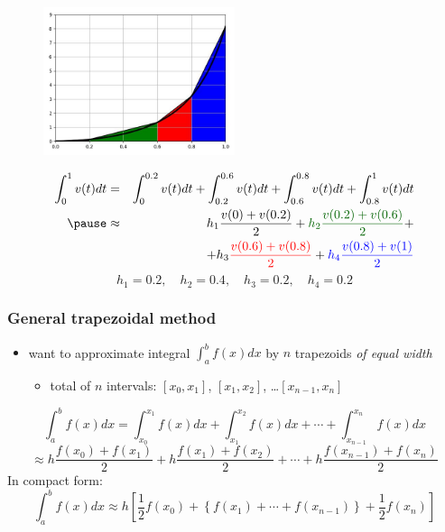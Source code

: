 \documentclass[english,14pt]{beamer}
\newcommand\red[1]{{\color{red} #1}}
\newcommand\blue[1]{{\color{blue} #1}}
\newcommand\darkGreen[1]{{\color{darkGreen} #1}}
\begin{document}

\begin{frame}[fragile]

\frametitle{}

\begin{figure}[ht]
	\centering
	\includegraphics[width=0.5\textwidth]{figures/fourPanel}
\end{figure}
\vspace*{-5mm}
{\small
\begin{eqnarray*}
\int_0^1 v(t)dt & = & \int_0^{0.2} v(t)dt + \int_{0.2}^{0.6} v(t)dt + \int_{0.6}^{0.8} v(t)dt + \int_{0.8}^1 v(t)dt \\
\pause
&\approx & h_1 \frac{v(0) + v(0.2)}{2} + \darkGreen{h_2 \frac{v(0.2) + v(0.6)}{2}} + \\
& & +h_3 \red{\frac{v(0.6) + v(0.8)}{2}} + \blue{h_4 \frac{v(0.8) + v(1)}{2}} 
\end{eqnarray*}
}
\pause
\vspace*{-5mm}
\[
h_1 = 0.2, \quad h_2 = 0.4, \quad h_3 = 0.2, \quad h_4 = 0.2
\]

\end{frame}


\begin{frame}[fragile]

\frametitle{General trapezoidal method}

\begin{itemize}
	\item want to approximate integral $\int_a^b f(x)dx$ by $n$ trapezoids \emph{of equal width}
	\begin{itemize}
		\item total of $n$ intervals: $[x_0,x_1]$, $[x_1,x_2]$, \ldots $[x_{n-1},x_n]$
	\end{itemize}
\end{itemize}

{\small
\[
\int_a^b f(x)dx = \int_{x_0}^{x_1} f(x)dx + \int_{x_1}^{x_2} f(x)dx + \cdots + \int_{x_{n-1}}^{x_n} f(x)dx
\]
\pause
\[
\approx h\frac{f(x_0)+f(x_1)}{2} + h\frac{f(x_1)+f(x_2)}{2} + \cdots + h\frac{f(x_{n-1}) + f(x_n)}{2}
\]
\pause
In compact form:
\blue{
\[
\int_a^b f(x)dx \approx h \left[ \frac{1}{2}f(x_0) + \left\{ f(x_1)+\cdots+f(x_{n-1}) \right\} + \frac{1}{2}f(x_n) \right]
\]
}}

\end{frame}
\end{document}
